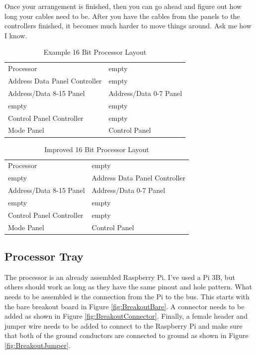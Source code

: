 \documentclass[10pt, openany]{book}
\begin{document}
Once your arrangement is finished, then you can go ahead and figure out how long your cables need to be.  After you have the cables from the panels to the controllers finished, it becomes much harder to move things around.  Ask me how I know.

\begin{table}
  \label{tbl:Basic}
  \caption{Example 16 Bit Processor Layout}
  \centering
  \begin{tabular}{|l|l|}
    \hline
    Processor & empty\\
    Address Data Panel Controller & empty\\
    Address/Data 8-15 Panel & Address/Data 0-7 Panel\\
    \hline
    empty & empty\\
    Control Panel Controller & empty\\
    Mode Panel & Control Panel\\
    \hline
  \end{tabular}
\end{table}

\begin{table}
  \label{tbl:Improved}
  \caption{Improved 16 Bit Processor Layout}
  \centering
  \begin{tabular}{|l|l|}
    \hline
    Processor & empty\\
    empty & Address Data Panel Controller\\
    Address/Data 8-15 Panel & Address/Data 0-7 Panel\\
    \hline
    empty & empty\\
    Control Panel Controller & empty\\
    Mode Panel & Control Panel\\
    \hline
  \end{tabular}
\end{table}

\subsection{Processor Tray}
The processor is an already assembled Raspberry Pi.  I've used a Pi 3B, but others should work as long as they have the same pinout and hole pattern.  What needs to be assembled is the connection from the Pi to the bus.  This starts with the bare breakout board in Figure \ref{fig:BreakoutBare}.  A connector needs to be added as shown in Figure \ref{fig:BreakoutConnector}.  Finally, a female header and jumper wire needs to be added to connect to the Raspberry Pi and make sure that both of the ground conductors are connected to ground as shown in Figure \ref{fig:BreakoutJumper}.
\end{document}
